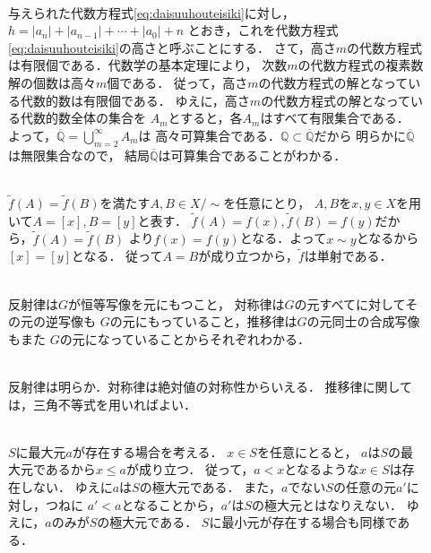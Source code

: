 \begin{description}
\item[] \mbox{} \\
  与えられた代数方程式\eqref{eq:daisuuhouteisiki}に対し，
  $h= \lvert a_n \rvert + \lvert a_{n-1} \rvert + \cdots + \lvert a_0 \rvert + n$
  とおき，これを代数方程式\eqref{eq:daisuuhouteisiki}の高さと呼ぶことにする．
  さて，高さ$m$の代数方程式は有限個である．代数学の基本定理により，
  次数$m$の代数方程式の複素数解の個数は高々$m$個である．
  従って，高さ$m$の代数方程式の解となっている代数的数は有限個である．
  ゆえに，高さ$m$の代数方程式の解となっている代数的数全体の集合を
  $A_m$とすると，各$A_m$はすべて有限集合である．
  よって，$\overline{\mathbb{Q}} = \bigcup_{m=2}^{\infty} A_m$は
  高々可算集合である．$\mathbb{Q} \subset \overline{\mathbb{Q}}$だから
  明らかに$\overline{\mathbb{Q}}$は無限集合なので，
  結局$\overline{\mathbb{Q}}$は可算集合であることがわかる．



\item[] \mbox{} \\
  $\tilde{f}(A) = \tilde{f}(B)$を満たす$A,B \in X/{\sim}$を任意にとり，
  $A,B$を$x,y \in X$を用いて$A= [x] , B=[y]$と表す．
  $\tilde{f} (A) = f(x) , \tilde{f} (B) = f(y)$だから，$\tilde{f} (A) = \tilde{f}(B)$
  より$f(x) = f(y)$となる．よって$x \sim y$となるから$[x]= [y]$となる．
  従って$A=B$が成り立つから，$\tilde{f}$は単射である．



\item[] \mbox{} \\
  反射律は$G$が恒等写像を元にもつこと，
  対称律は$G$の元すべてに対してその元の逆写像も
  $G$の元にもっていること，推移律は$G$の元同士の合成写像もまた
  $G$の元になっていることからそれぞれわかる．

\item[] \mbox{} \\
  反射律は明らか．対称律は絶対値の対称性からいえる．
  推移律に関しては，三角不等式を用いればよい．

\item[] \mbox{} \\
  $S$に最大元$a$が存在する場合を考える．
  $x \in S$を任意にとると，
  $a$は$S$の最大元であるから$x \leq a$が成り立つ．
  従って，$a<x$となるような$x \in S$は存在しない．
  ゆえに$a$は$S$の極大元である．
  また，$a$でない$S$の任意の元$a'$に対し，つねに
  $a' < a$となることから，$a'$は$S$の極大元とはなりえない．
  ゆえに，$a$のみが$S$の極大元である．
  $S$に最小元が存在する場合も同様である．
  


\end{description}
